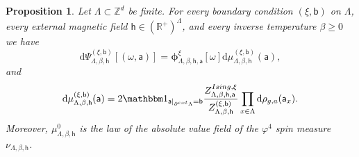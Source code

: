 \documentclass[11pt,a4paper]{article}
\newtheorem{proposition}[theorem]{Proposition}
\theoremstyle{definition}
\numberwithin{equation}{section}
\begin{document}
\begin{proposition} \label{prop: phi4rc is annealed rndisingrc}
Let $\Lambda \subset\mathbb Z^d$ be finite. For every boundary condition $(\xi,\mathsf{b})$ on $\Lambda$, every external magnetic field $\mathsf h\in (\mathbb R^+)^{\Lambda}$, and every inverse temperature $\beta\geq 0$ we have
\begin{equation} \label{eq: annealed-quenched rc}
\mathrm{d}\Psi_{\Lambda,\beta,\mathsf h}^{(\xi,\mathsf{b})}[(\omega,\mathsf{a})]=\boldsymbol{\phi}^{\xi}_{\Lambda,\beta,\mathsf h, \mathsf a}[\omega] \mathrm{d}\mu_{\Lambda,\beta,\mathsf{h}}^{(\xi,\mathsf{b})}(\mathsf{a}),
\end{equation}
and 
\begin{equation}\label{eq: absolute value density}
\mathrm{d}\mu_{\Lambda,\beta,\mathsf{h}}^{(\xi,\mathsf{b})}(\mathsf{a}) = 2\mathbbm 1_{\mathsf a|_{\partial^{\rm ext}\Lambda}=\mathsf b} \frac{Z^{{\rm Ising}, \xi}_{\Lambda,\beta,\mathsf h, \mathsf a}}{Z^{(\xi,\mathsf b)}_{\Lambda,\beta,\mathsf h}} \prod_{x \in \Lambda} \mathrm{d}\rho_{g,a}(\mathsf a_x).
\end{equation}
Moreover, $\mu^{0}_{\Lambda,\beta,\mathsf h}$ is the law of the absolute value field of the $\varphi^4$ spin measure $\nu_{\Lambda,\beta,\mathsf h}$.
\end{proposition}
\end{document}
